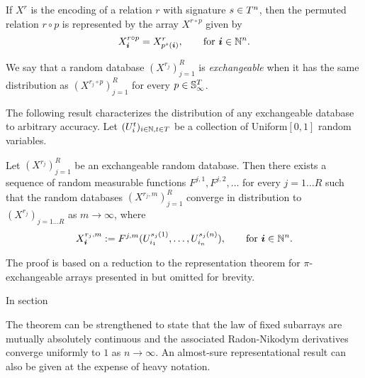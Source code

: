 If $X^r$ is the encoding of a relation $r$ with signature $s \in T^n$, then the permuted relation $r \circ p$ is represented by the array $X^{r\circ p}$ given by
\[
X^{r \circ p}_{\bm{i}} = X^r_{p^s(\bm{i})}, \qquad \text{for } \bm{i} \in \mathbb{N}^n.
\]


\begin{definition}
We say that a random database $(X^{r_j})_{j=1}^R$ is \emph{exchangeable} when it has the same distribution as $(X^{r_j\circ p})_{j=1}^R$ for every $p \in \mathbb{S}_{\infty}^T$.
\end{definition}




The following result characterizes the distribution of any exchangeable database to arbitrary accuracy. 
Let $(U^t_i)_{i\in\mathbb{N},t \in T}$ be a collection of \iid Uniform$[0,1]$ random variables.

\begin{thm}
  \label{thm:simple-database}
   Let $(X^{r_j})_{j=1}^R$ be an exchangeable random database.
   Then there exists a sequence of random measurable functions $F^{j,1}, F^{j,2}, \dotsc$ for 
   every $j=1\ldots R$ such that 
   the random databases $(X^{r_j,m})_{j=1}^R$
    converge in distribution to $(X^{r_j})_{j=1\ldots R}$ as $m \to \infty$, where   
   \[
     X^{r_j,m}_{\bm{i}} := F^{j,m}(U^{s_j(1)}_{i_1},\dotsc,U^{s_j(n)}_{i_n}), \qquad \text{for } \bm{i} \in \mathbb{N}^n.
   \]
\end{thm}

The proof is based on a reduction to the representation theorem for $\pi$-exchangeable arrays presented in \cite{Kallenberg1999a} but omitted for brevity.

In section

The theorem can be strengthened to state that the law of fixed subarrays are mutually absolutely continuous and the associated Radon-Nikodym derivatives converge uniformly to $1$ as $n \to \infty$.  An almost-sure representational result can also be given at the expense of heavy notation.

